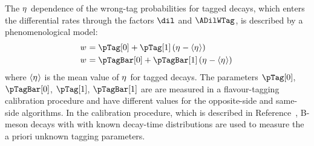 The $\eta^{}$ dependence of the wrong-tag probabilities for tagged decays, which enters the differential rates through the factors $\dil$
and $\ADilWTag$, is described by a phenomenological model:
\begin{subequations}
  \begin{align}
    \wTag &= \pTag[0]    + \pTag[1]\,    (\etaTag-\langle\etaTag\rangle) \\
    \wTag &= \pTagBar[0] + \pTagBar[1]\, (\etaTag-\langle\etaTag\rangle) \,
  \end{align}
\end{subequations}
where $\langle\eta^{}\rangle$ is the mean value of $\eta^{}$ for tagged decays. The parameters $\pTag[0]$, $\pTagBar[0]$, $\pTag[1]$,
$\pTagBar[1]$ are are measured in a flavour-tagging calibration procedure and have different values for the opposite-side and same-side
algorithms. In the calibration procedure, which is described in Reference~\cite{LHCb-ANA-2014-039}, B-meson decays with with known
decay-time distributions are used to measure the a priori unknown tagging parameters. 

